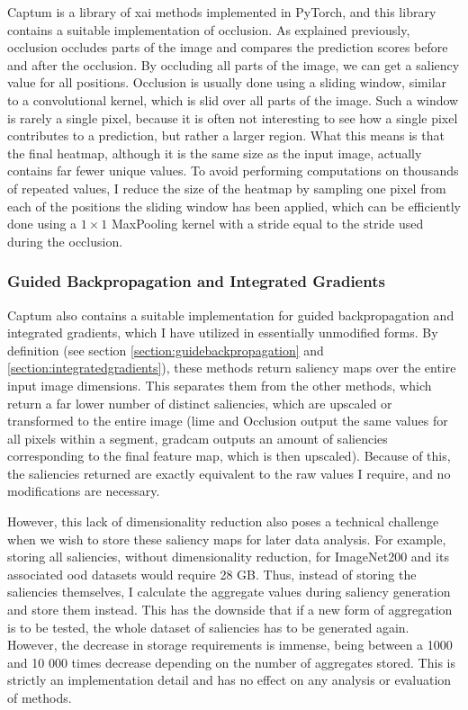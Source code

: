 \documentclass[UKenglish]{uiomasterthesis} %
\theoremstyle{definition}
\begin{document}
Captum \cite{captum} is a library of \ac{xai} methods implemented in PyTorch, and this library contains a suitable implementation of occlusion. As explained previously, occlusion occludes parts of the image and compares the prediction scores before and after the occlusion. By occluding all parts of the image, we can get a saliency value for all positions. Occlusion is usually done using a sliding window, similar to a convolutional kernel, which is slid over all parts of the image. Such a window is rarely a single pixel, because it is often not interesting to see how a single pixel contributes to a prediction, but rather a larger region. What this means is that the final heatmap, although it is the same size as the input image, actually contains far fewer unique values. To avoid performing computations on thousands of repeated values, I reduce the size of the heatmap by sampling one pixel from each of the positions the sliding window has been applied, which can be efficiently done using a $1 \times 1$ MaxPooling kernel with a stride equal to the stride used during the occlusion.

\subsubsection{Guided Backpropagation and Integrated Gradients}

Captum also contains a suitable implementation for guided backpropagation and integrated gradients, which I have utilized in essentially unmodified forms. By definition (see section \ref{section:guidebackpropagation} and \ref{section:integratedgradients}), these methods return saliency maps over the entire input image dimensions. This separates them from the other methods, which return a far lower number of distinct saliencies, which are upscaled or transformed to the entire image (\ac{lime} and Occlusion output the same values for all pixels within a segment, \ac{gradcam} outputs an amount of saliencies corresponding to the final feature map, which is then upscaled). Because of this, the saliencies returned are exactly equivalent to the raw values I require, and no modifications are necessary.

However, this lack of dimensionality reduction also poses a technical challenge when we wish to store these saliency maps for later data analysis. For example, storing all saliencies, without dimensionality reduction, for ImageNet200 and its associated \ac{ood} datasets would require 28 GB. Thus, instead of storing the saliencies themselves, I calculate the aggregate values during saliency generation and store them instead. This has the downside that if a new form of aggregation is to be tested, the whole dataset of saliencies has to be generated again. However, the decrease in storage requirements is immense, being between a 1000 and 10 000 times decrease depending on the number of aggregates stored. This is strictly an implementation detail and has no effect on any analysis or evaluation of methods.
\end{document}
